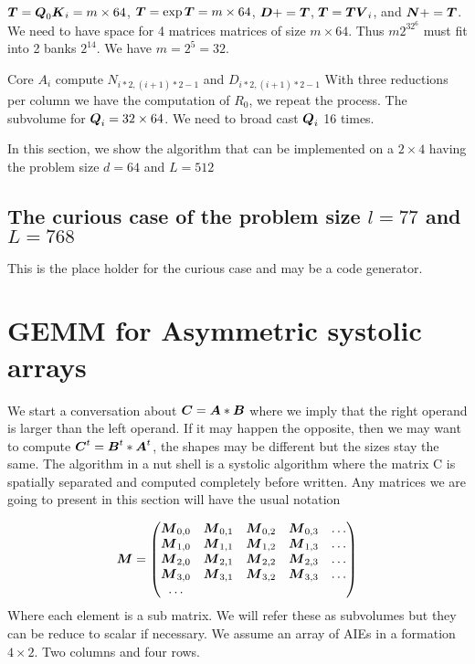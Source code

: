 \documentclass[conference]{IEEEtran}
\begin{document}
${\boldsymbol T} = {\boldsymbol Q}_0{\boldsymbol K}_i = m \times 64$, 
${\boldsymbol T} = \exp{{\boldsymbol T}} = m \times 64$,
${\boldsymbol D} += {\boldsymbol T}$, ${\boldsymbol T} = {\boldsymbol T}{\boldsymbol V}_i$, and ${\boldsymbol N} +=
{\boldsymbol T}$. We need to have space for 4 matrices matrices of size $ m
\times 64$. Thus $m2^32^6$ must fit into 2 banks $2^{14}$.  We have $m
= 2^5 = 32$.

Core $A_i$ compute $N_{i*2,(i+1)*2 -1}$ and $D_{i*2,(i+1)*2 -1}$ With
three reductions per column we have the computation of $R_0$, we
repeat the process.  The subvolume for ${\boldsymbol Q}_i = 32\times 64$.  We
need to broad cast ${\boldsymbol Q}_i$ 16 times.



In this section, we show the algorithm that can be implemented on a
$2\times 4$ having the problem size $d=64$ and $L=512$



\subsection{The curious case of the problem size $l=77$ and $L=768$}

This is the place holder for the curious case and may be a code
generator. 


\newpage
\section{GEMM for Asymmetric systolic arrays}

We start a conversation about ${\boldsymbol C} = {\boldsymbol A}*{\boldsymbol B}$ where we imply
that the right operand is larger than the left operand. If it may
happen the opposite, then we may want to compute ${\boldsymbol C}^t =
{\boldsymbol B}^t*{\boldsymbol A}^t$, the shapes may be different but the sizes stay the
same. The algorithm in a nut shell is a systolic algorithm where the
matrix C is spatially separated and computed completely before
written. Any matrices we are going to present in this section will
have the usual notation

\begin{equation*} {\boldsymbol M} =
    \begin{pmatrix}
    {\boldsymbol M}_{0,0} & {\boldsymbol M}_{0,1} & {\boldsymbol M}_{0,2} & {\boldsymbol M}_{0,3} & \dots \\
    {\boldsymbol M}_{1,0} & {\boldsymbol M}_{1,1} & {\boldsymbol M}_{1,2} & {\boldsymbol M}_{1,3} & \dots \\
    {\boldsymbol M}_{2,0} & {\boldsymbol M}_{2,1} & {\boldsymbol M}_{2,2} & {\boldsymbol M}_{2,3} & \dots \\
    {\boldsymbol M}_{3,0} & {\boldsymbol M}_{3,1} & {\boldsymbol M}_{3,2} & {\boldsymbol M}_{3,3} & \dots \\
    \dots
  \end{pmatrix}  
\end{equation*}
Where each element is a sub matrix. We will refer these as subvolumes
but they can be reduce to scalar if necessary.  We assume an array of
AIEs in a formation $4 \times 2$. Two columns and four rows.
\end{document}
